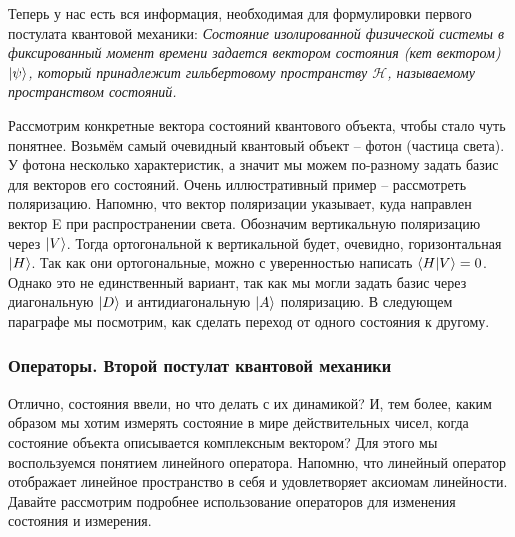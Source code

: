 Теперь у нас есть вся информация, необходимая для формулировки первого постулата квантовой механики: \textit{Состояние изолированной физической системы в фиксированный момент времени задается вектором состояния (кет вектором) $\ket{\psi}$, который принадлежит гильбертовому пространству $\mathcal{H}$, называемому пространством состояний.}

Рассмотрим конкретные вектора состояний квантового объекта, чтобы стало чуть понятнее. Возьмём самый очевидный квантовый объект -- фотон (частица света). У фотона несколько характеристик, а значит мы можем по-разному задать базис для векторов его состояний. Очень иллюстративный пример -- рассмотреть поляризацию. Напомню, что вектор поляризации указывает, куда направлен вектор E при распространении света. Обозначим вертикальную поляризацию через $\ket{V}$. Тогда ортогональной к вертикальной будет, очевидно, горизонтальная $\ket{H}$. Так как они ортогональные, можно с уверенностью написать $\bra{H}\ket{V} = 0$. Однако это не единственный вариант, так как мы могли задать базис через диагональную $\ket{D}$ и антидиагональную $\ket{A}$ поляризацию. В следующем параграфе мы посмотрим, как сделать переход от одного состояния к другому.

\subsubsection*{Операторы. Второй постулат квантовой механики}

\hspace{1em} Отлично, состояния ввели, но что делать с их динамикой? И, тем более, каким образом мы хотим измерять состояние в мире действительных чисел, когда состояние объекта описывается комплексным вектором? Для этого мы воспользуемся понятием линейного оператора. Напомню, что линейный оператор отображает линейное пространство в себя и удовлетворяет аксиомам линейности. Давайте рассмотрим подробнее использование операторов для изменения состояния и измерения.

